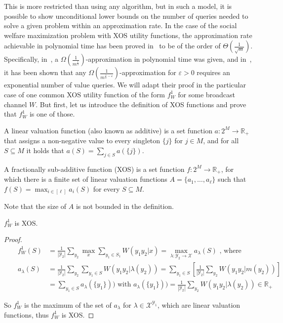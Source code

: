 This is more restricted than using any algorithm, but in such a model, it is possible to show unconditional lower bounds on the number of queries needed to solve a given problem within an approximation rate. In the case of the social welfare maximization problem with \textrm{XOS} utility functions, the approximation rate achievable in polynomial time has been proved in~\cite{DS06,MSV08} to be of the order of $\Theta\left(\frac{1}{\sqrt{m}}\right)$. Specifically, in~\cite{DS06}, a $\Omega\left(\frac{1}{m^{\frac{1}{2}}}\right)$-approximation in polynomial time was given, and in~\cite{MSV08}, it has been shown that any $\Omega\left(\frac{1}{m^{\frac{1}{2}-\varepsilon}}\right)$-approximation for $\varepsilon > 0$ requires an exponential number of value queries. We will adapt their proof in the particular case of one common \textrm{XOS} utility function of the form $f_W^1$ for some broadcast channel $W$. But first, let us introduce the definition of \textrm{XOS} functions and prove that $f_W^1$ is one of those.

\begin{definition}
  A linear valuation function (also known as additive) is a set function $a : 2^M \rightarrow \mathbb{R}_+$ that assigns a non-negative value to every singleton $\{ j\}$ for $j \in M$, and for all $S \subseteq M$ it holds that $a(S) = \sum_{j \in S} a(\{ j\})$.

  A fractionally sub-additive function (\textrm{XOS}) is a set function $f : 2^M \rightarrow \mathbb{R}_+$, for which there is a finite set of linear valuation functions $A = \{ a_1, \ldots, a_{\ell} \}$ such that $f(S) = \max_{i \in [\ell]} a_i(S)$ for every $S \subseteq M$.
\end{definition}

\begin{rk}
  Note that the size of $A$ is not bounded in the definition. 
\end{rk}

\begin{proposition}
  $f_W^1$ is \textrm{XOS}.
\end{proposition}
\begin{proof}
  \begin{equation}
    \begin{aligned}
      &&f_W^1(S) &= \frac{1}{|\mathcal{Y}_2|}\sum_{y_2} \max_x \sum_{y_1 \in S_1} W(y_1y_2|x) = \max_{\lambda : \mathcal{Y}_2 \rightarrow \mathcal{X}} a_{\lambda}(S) \text{ , where}\\
      &&a_{\lambda}(S) &= \frac{1}{|\mathcal{Y}_2|}\sum_{y_2}  \sum_{y_1 \in S} W(y_1y_2|\lambda(y_2)) = \sum_{y_1 \in S} \left[\frac{1}{|\mathcal{Y}_2|}\sum_{y_2}  W(y_1y_2|m(y_2))\right]\\
      &&&= \sum_{y_1 \in S} a_{\lambda}(\{ y_1 \})) \text{ with } a_{\lambda}(\{ y_1 \})) = \frac{1}{|\mathcal{Y}_2|}\sum_{y_2}  W(y_1y_2|\lambda(y_2)) \in \mathbb{R}_+
      \end{aligned}
  \end{equation}

  So $f_W^1$ is the maximum of the set of $a_{\lambda}$ for $\lambda \in \mathcal{X}^{\mathcal{Y}_1}$, which are linear valuation functions, thus $f_W^1$ is \textrm{XOS}.
\end{proof}

